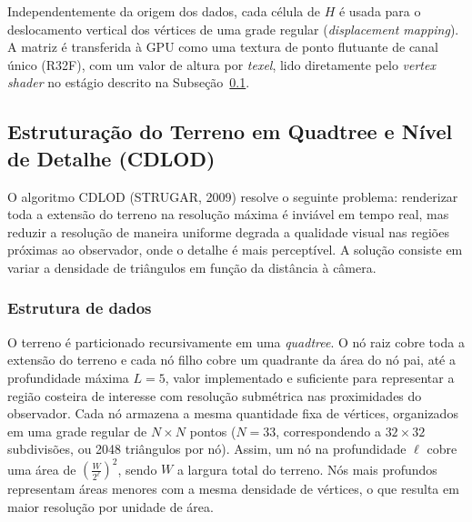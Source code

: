 \documentclass[conference]{IEEEtran}
\begin{document}
Independentemente da origem dos dados, cada célula de $H$ é usada para o
deslocamento vertical dos vértices de uma grade regular (\emph{displacement
mapping}). A matriz é transferida à GPU como uma textura de ponto flutuante
de canal único (R32F), com um valor de altura por \emph{texel}, lido
diretamente pelo \emph{vertex shader} no estágio descrito na
Subseção~\ref{sub:cdlod}.

\subsection{Estruturação do Terreno em Quadtree e Nível de Detalhe (CDLOD)}
\label{sub:cdlod}

O algoritmo CDLOD (STRUGAR, 2009) resolve o seguinte problema: renderizar
toda a extensão do terreno na resolução máxima é inviável em tempo real, mas
reduzir a resolução de maneira uniforme degrada a qualidade visual nas
regiões próximas ao observador, onde o detalhe é mais perceptível. A solução
consiste em variar a densidade de triângulos em função da distância à
câmera.

\subsubsection{Estrutura de dados}
O terreno é particionado recursivamente em uma \emph{quadtree}. O nó raiz
cobre toda a extensão do terreno e cada nó filho cobre um quadrante da área
do nó pai, até a profundidade máxima $L = 5$, valor implementado e
suficiente para representar a região costeira de interesse com resolução
submétrica nas proximidades do observador. Cada nó armazena a mesma
quantidade fixa de vértices, organizados em uma grade regular de
$N \times N$ pontos ($N = 33$, correspondendo a $32 \times 32$ subdivisões,
ou 2048 triângulos por nó). Assim, um nó na profundidade $\ell$ cobre uma
área de $\left(\frac{W}{2^{\ell}}\right)^2$, sendo $W$ a largura total do
terreno. Nós mais profundos representam áreas menores com a mesma densidade
de vértices, o que resulta em maior resolução por unidade de área.
\end{document}
